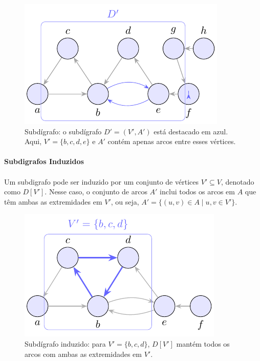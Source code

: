 \documentclass[12pt,a4paper]{article}
\def\emph#1{#1}%
\begin{document}
\begin{figure}[H]
    \centering
    \includegraphics[width=0.9\linewidth]{figures/fig_subdigrafo.pdf}

    \caption{Subdígrafo: o subdígrafo $D'=(V',A')$ está destacado em azul. Aqui, $V'=\{b,c,d,e\}$ e $A'$ contém apenas arcos entre esses vértices.}
    \label{fig:subdigrafo}
    \end{figure}


\paragraph{Subdigrafos Induzidos}
\paragraph{}
Um subdigrafo pode ser \emph{induzido} por um conjunto de vértices \(V' \subseteq V\), denotado como \(D[V']\). Nesse caso, o conjunto de arcos \(A'\) inclui todos os arcos em \(A\) que têm ambas as extremidades em \(V'\), ou seja, \(A' = \{(u, v) \in A \mid u, v \in V'\}\).


\begin{figure}[H]
    \centering
    \includegraphics[width=0.9\linewidth]{figures/fig_subdigrafo_induzido.pdf}

    \caption{Subdígrafo induzido: para $V'=\{b,c,d\}$, $D[V']$ mantém todos os arcos com ambas as extremidades em $V'$.}
    \label{fig:subdigrafo-induzido}
    \end{figure}
\end{document}
